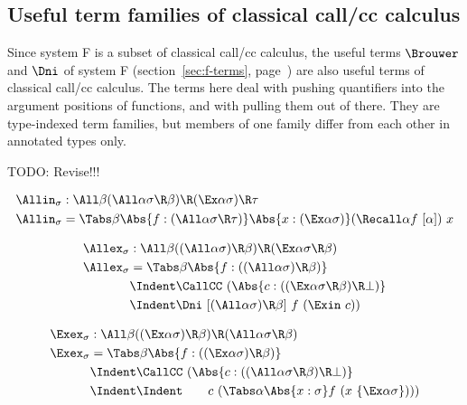 \documentclass{amsart}
\begin{document}
\FRules

\DoubleNegationElimination

\ExistentialElimination

\subsection{Useful term families of classical  call/cc calculus}

Since system F is a subset of classical call/cc calculus, the
useful terms $\Brouwer$ and $\Dni$ of system F
(section~\ref{sec:f-terms}, page~\pageref{sec:f-terms}) are also
useful terms of classical call/cc calculus. The terms here deal
with pushing quantifiers into the argument positions of
functions, and with pulling them out of there. They are
type-indexed term families, but members of one family differ
from each other in annotated types only.

TODO: Revise!!!

\begin{align*}
\Allin_\sigma & : \All\beta
  (\All\alpha \sigma\R\beta) \R
  (\Ex\alpha \sigma) \R \tau
  \\
\Allin_\sigma & = \Tabs\beta
  \Abs{f : (\All\alpha \sigma \R \tau)}
  \Abs{x : (\Ex\alpha \sigma)}
  (\Recall\alpha f~[\alpha])~x
\end{align*}

\begin{align*}
\Allex_\sigma & : \All\beta
  ((\All\alpha\sigma) \R \beta) \R
  (\Ex\alpha \sigma \R \beta)
  \\
\Allex_\sigma & = \Tabs\beta
  \Abs{f : ((\All\alpha\sigma) \R \beta)}
  \\ &\Indent
  \CallCC~(\Abs{c : ((\Ex\alpha \sigma \R \beta) \R \bot)}
  \\ &\Indent
  \Dni~[(\All\alpha\sigma) \R \beta]~f~(
    \Exin~c
  ))
\end{align*}

\begin{align*}
\Exex_\sigma & : \All\beta
  ((\Ex\alpha \sigma) \R \beta) \R
  (\All\alpha \sigma \R \beta)
  \\
\Exex_\sigma & = \Tabs\beta
  \Abs{f:((\Ex\alpha\sigma) \R \beta)}
  \\ &\Indent
  \CallCC~(\Abs{c : ((\All\alpha \sigma \R \beta) \R \bot)}
  \\ &\Indent\Indent\hspace{2em}
  c~(\Tabs\alpha \Abs{x : \sigma}
  f~(x~\{\Ex\alpha \sigma\})))
\end{align*}
\end{document}
